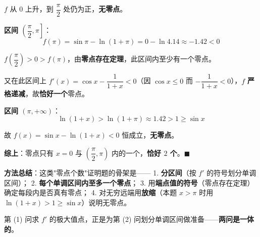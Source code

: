 \begin{answer}
$f$ 从 $0$ 上升，到 $\dfrac\pi2$ 处仍为正，\textbf{无零点}。

\textbf{区间 $\left(\dfrac\pi2,\pi\right]$}：
\nopagebreak[4]
\[f(\pi)=\sin\pi-\ln(1+\pi)=0-\ln4.14\approx-1.42<0\]

$f\left(\dfrac\pi2\right)>0>f(\pi)$，由\textbf{零点存在定理}，此区间内至少有一个零点。

又在此区间上 $f'(x)=\cos x-\dfrac1{1+x}<0$（因 $\cos x\le0$ 而 $-\dfrac1{1+x}<0$），$f$ \textbf{严格递减}，故\textbf{恰好一个}零点。

\textbf{区间 $(\pi,+\infty)$}：
\nopagebreak[4]
\[\ln(1+x)>\ln(1+\pi)\approx1.42>1\ge\sin x\]

故 $f(x)=\sin x-\ln(1+x)<0$ 恒成立，\textbf{无零点}。

\textbf{综上}：零点只有 $x=0$ 与 $\left(\dfrac\pi2,\pi\right)$ 内的一个，\textbf{恰好 $2$ 个}。$\blacksquare$

\begin{gktip}
\textbf{方法总结}：这类"零点个数"证明题的骨架是——
1. \textbf{分区间}（按 $f'$ 的符号划分单调区间）；
2. \textbf{每个单调区间内至多一个零点}；
3. 用\textbf{端点值的符号}（零点存在定理）确定每段内是否真有零点；
4. 对无穷远端用\textbf{放缩}（本题 $x>\pi$ 时用 $\ln(1+x)>1\ge\sin x$）说明无零点。

第 (1) 问求 $f'$ 的极大值点，正是为第 (2) 问划分单调区间做准备——\textbf{两问是一体的}。
\end{gktip}



\par\medskip

\end{answer}
